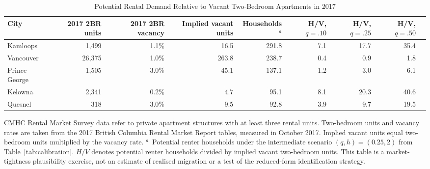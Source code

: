 \begin{table}[htbp]
  \caption{Potential Rental Demand Relative to Vacant Two-Bedroom Apartments in 2017}
  \label{tab:vacancy_calibration}
  \bigskip
  \centering
  \begin{tabular}{lrrrrrrrr}
    \toprule
    City & 2017 2BR units & 2017 2BR vacancy & Implied vacant units & Households$^{a}$ & H/V, $q{=}.10$ & H/V, $q{=}.25$ & H/V, $q{=}.50$ \\
    \midrule
    Kamloops & 1,499 & 1.1\% & 16.5 & 291.8 & 7.1 & 17.7 & 35.4 \\
    Vancouver & 26,375 & 1.0\% & 263.8 & 238.7 & 0.4 & 0.9 & 1.8 \\
    Prince George & 1,505 & 3.0\% & 45.1 & 137.1 & 1.2 & 3.0 & 6.1 \\
    Kelowna & 2,341 & 0.2\% & 4.7 & 95.1 & 8.1 & 20.3 & 40.6 \\
    Quesnel & 318 & 3.0\% & 9.5 & 92.8 & 3.9 & 9.7 & 19.5 \\
    \bottomrule
  \end{tabular}
  \par\raggedright\smallskip
  \footnotesize
  CMHC Rental Market Survey data refer to private apartment structures with at least three rental units. Two-bedroom units and vacancy rates are taken from the 2017 British Columbia Rental Market Report tables, measured in October 2017. Implied vacant units equal two-bedroom units multiplied by the vacancy rate. $^{a}$~Potential renter households under the intermediate scenario $(q,h)=(0.25,2)$ from Table~\ref{tab:calibration}. $H/V$ denotes potential renter households divided by implied vacant two-bedroom units. This table is a market-tightness plausibility exercise, not an estimate of realised migration or a test of the reduced-form identification strategy.
\end{table}

